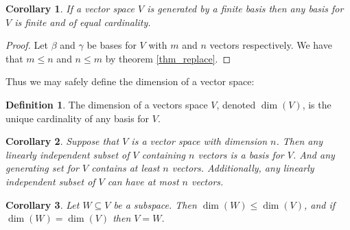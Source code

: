 \documentclass[oneside, 12pt]{book}
\newtheorem{cor}{Corollary}[section]
\theoremstyle{definition}
\newtheorem{defn}{Definition}[section]
\begin{document}
\begin{cor}
\label{thm_dim}
If a vector space $V$ is generated by a finite basis then any basis for $V$ is finite and of equal cardinality.
\end{cor}
\begin{proof}
Let $\beta$ and $\gamma$ be bases for $V$ with $m$ and $n$ vectors respectively. We have that $m \leq n$ and $n \leq m$ by theorem \ref{thm_replace}.
\end{proof}
Thus we may safely define the dimension of a vector space:
\begin{defn}
\label{defn_dim}
The dimension of a vectors space $V$, denoted $\dim(V)$, is the unique cardinality of any basis for $V$.
\end{defn}
\begin{cor}
\label{cor_base}
Suppose that $V$ is a vector space with dimension $n$. Then any linearly independent subset of $V$ containing $n$ vectors is a basis for $V$.
And any generating set for $V$ contains at least $n$ vectors.
Additionally, any linearly independent subset of $V$ can have at most $n$ vectors.
\end{cor}
\begin{cor}
\label{cor_bassub}
Let $W\subseteq V$ be a subspace. Then $\dim(W)\leq \dim(V)$, and if $\dim(W)=\dim(V)$ then $V=W$.
\end{cor}
\end{document}
